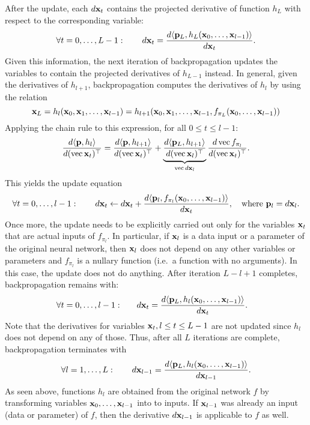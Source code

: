 After the update, each $d\mathbf{x}_t$ contains the projected derivative of function $h_L$ with respect to the corresponding variable:
\[
\forall t=0,\dots,L-1:\qquad
d\mathbf{x}_t = \frac{d\langle \mathbf{p}_L, h_L(\mathbf{x}_0,\dots,\mathbf{x}_{l-1})\rangle}{d\mathbf{x}_t}.
\]
Given this information, the next iteration of backpropagation updates the variables to contain the projected derivatives of $h_{L-1}$ instead. In general, given the derivatives of $h_{l+1}$, backpropagation computes the derivatives of $h_{l}$ by using the relation
\[
 \mathbf{x}_L
 = 
 h_{l}(\mathbf{x}_0,\mathbf{x}_1,\dots,\mathbf{x}_{l-1})
 =
 h_{l+1}(\mathbf{x}_0,\mathbf{x}_1,\dots,\mathbf{x}_{l-1},f_{\pi_L}(\mathbf{x}_0,\dots,\mathbf{x}_{l-1}))
\]
Applying the chain rule to this expression, for all $0\leq t \leq l-1$:
\[
\frac{d\langle \mathbf{p}, h_l \rangle}{d(\operatorname{vec} \mathbf{x}_t)^\top}
=
\frac{d\langle \mathbf{p}, h_{l+1}\rangle}{d(\operatorname{vec} \mathbf{x}_t)^\top}
+
\underbrace{\frac{d\langle \mathbf{p}_L, h_{l+1}\rangle}{d(\operatorname{vec} \mathbf{x}_l)^\top}}_{\operatorname{vec} d\mathbf{x}_l}
\frac{d \operatorname{vec} f_{\pi_l}}{d(\operatorname{vec} \mathbf{x}_t)^\top}.
\]
This yields the update equation
\begin{equation}\label{e:bp-update}	
\forall t=0,\dots,l-1:\qquad
d\mathbf{x}_t \leftarrow d\mathbf{x}_t + \frac{d\langle \mathbf{p}_l, f_{\pi_l}(\mathbf{x}_0,\dots,\mathbf{x}_{l-1})\rangle}{d\mathbf{x}_t},
\quad
\text{where\ }
\mathbf{p}_l = d\mathbf{x}_l.
\end{equation}
Once more, the update needs to be explicitly carried out only for the variables $\mathbf{x}_t$ that are actual inputs of $f_{\pi_l}$. In particular, if $\mathbf{x}_l$ is a data input or a parameter of the original neural network, then $\mathbf{x}_l$ does not depend on any other variables or parameters and $f_{\pi_l}$ is a nullary function (i.e.\ a function with no arguments). In this case, the update does not do anything. 
After iteration $L-l+1$ completes, backpropagation remains with:
\begin{align*}
\forall t=0,\dots,l-1:&\qquad
d\mathbf{x}_t
=
\frac{d\langle \mathbf{p}_L, h_l(\mathbf{x}_0,\dots,\mathbf{x}_{l-1})\rangle}{d\mathbf{x}_t}.
\end{align*}
Note that the derivatives for variables $\mathbf{x}_t, l \leq t \leq L-1$ are not updated since $h_l$ does not depend on any of those. Thus, after all $L$ iterations are complete, backpropagation terminates with
\[
\forall l=1,\dots,L:\qquad
d\mathbf{x}_{l-1}
=
\frac{d\langle \mathbf{p}_L, h_{l}(\mathbf{x}_0,\dots,\mathbf{x}_{l-1})\rangle}{d\mathbf{x}_{l-1}}.
\]
As seen above, functions $h_{l}$ are obtained from the original network $f$ by transforming variables $\mathbf{x}_0,\dots,\mathbf{x}_{l-1}$ into to inputs. If $\mathbf{x}_{l-1}$ was already an input (data or parameter) of $f$, then the derivative $d\mathbf{x}_{l-1}$ is applicable to $f$ as well.

